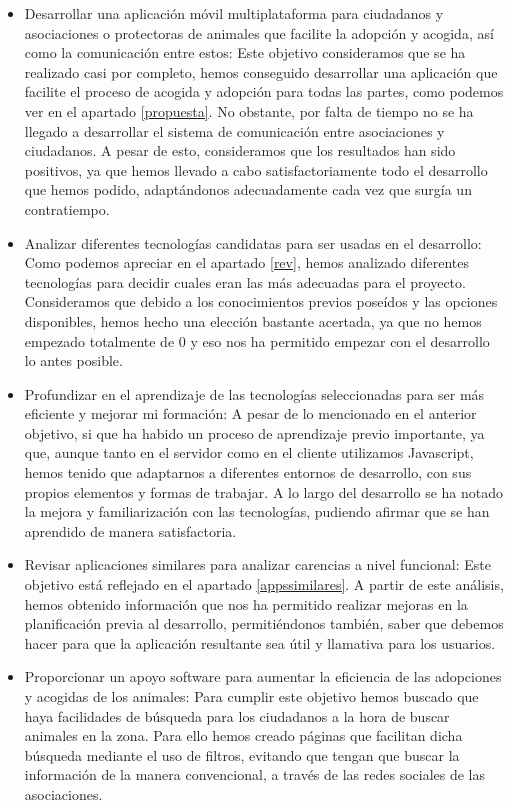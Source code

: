 \begin{itemize}
	\item Desarrollar una aplicación móvil multiplataforma para ciudadanos y asociaciones o protectoras de animales que facilite la adopción y acogida, así como la comunicación entre estos: Este objetivo consideramos que se ha realizado casi por completo, hemos conseguido desarrollar una aplicación que facilite el proceso de acogida y adopción para todas las partes, como podemos ver en el apartado \ref{propuesta}. No obstante, por falta de tiempo no se ha llegado a desarrollar el sistema de comunicación entre asociaciones y ciudadanos. A pesar de esto, consideramos que los resultados han sido positivos, ya que hemos llevado a cabo satisfactoriamente todo el desarrollo que hemos podido, adaptándonos adecuadamente cada vez que surgía un contratiempo.
	
	\item Analizar diferentes tecnologías candidatas para ser usadas en el desarrollo: Como podemos apreciar en el apartado \ref{rev}, hemos analizado diferentes tecnologías para decidir cuales eran las más adecuadas para el proyecto. Consideramos que debido a los conocimientos previos poseídos y las opciones disponibles, hemos hecho una elección bastante acertada, ya que no hemos empezado totalmente de 0 y eso nos ha permitido empezar con el desarrollo lo antes posible.
	
	\item Profundizar en el aprendizaje de las tecnologías seleccionadas para ser más eficiente y mejorar mi formación: A pesar de lo mencionado en el anterior objetivo, si que ha habido un proceso de aprendizaje previo importante, ya que, aunque tanto en el servidor como en el cliente utilizamos Javascript, hemos tenido que adaptarnos a diferentes entornos de desarrollo, con sus propios elementos y formas de trabajar. A lo largo del desarrollo se ha notado la mejora y familiarización con las tecnologías, pudiendo afirmar que se han aprendido de manera satisfactoria.
	
	\item Revisar aplicaciones similares para analizar carencias a nivel funcional: Este objetivo está reflejado en el apartado \ref{appssimilares}. A partir de este análisis, hemos obtenido información que nos ha permitido realizar mejoras en la planificación previa al desarrollo, permitiéndonos también, saber que debemos hacer para que la aplicación resultante sea útil y llamativa para los usuarios.
	
	\item Proporcionar un apoyo software para aumentar la eficiencia de las adopciones y acogidas de los animales: Para cumplir este objetivo hemos buscado que haya facilidades de búsqueda para los ciudadanos a la hora de buscar animales en la zona. Para ello hemos creado páginas que facilitan dicha búsqueda mediante el uso de filtros, evitando que tengan que buscar la información de la manera convencional, a través de las redes sociales de las asociaciones.
	

\end{itemize}
